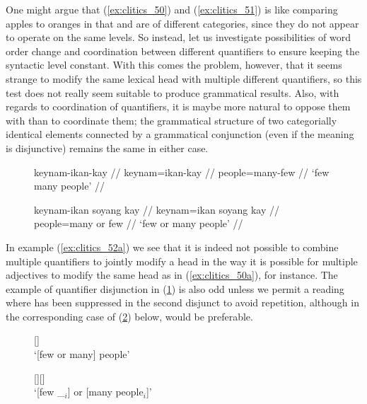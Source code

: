 One might argue that (\ref{ex:clitics_50}) and (\ref{ex:clitics_51}) is like
comparing apples to oranges in that  and
 are of different categories, since they do not
appear to operate on the same levels. So instead, let us investigate
possibilities of word order change and coordination between different
quantifiers to ensure keeping the syntactic level constant. With this comes the
problem, however, that it seems strange to modify the same lexical head with
multiple different quantifiers, so this test does not really seem suitable to
produce grammatical results. Also, with regards to coordination of quantifiers,
it is maybe more natural to oppose them with  than to
coordinate them; the grammatical structure of two categorially identical
elements connected by a grammatical conjunction (even if the meaning is
disjunctive) remains the same in either case.

\begin{figure}[h]
\pex\label{ex:clitics_52}
\a\label{ex:clitics_52a}\ljudge{*}\begingl
	\gla keynam-ikan-kay //
	\glb keynam=ikan-kay //
	\glc people=many-few //
	\glft `few many people' //
\endgl

\a\label{ex:clitics_52b}\ljudge{\ques}\begingl
	\gla keynam-ikan soyang kay //
	\glb keynam=ikan soyang kay //
	\glc people=many or few //
	\glft `few or many people' //
\endgl
\xe
\end{figure}

In example (\ref{ex:clitics_52a}) we see that it is indeed not possible to
combine multiple quantifiers to jointly modify a head in the way it is possible
for multiple adjectives to modify the same head as in (\ref{ex:clitics_50a}),
for instance. The example of quantifier disjunction in (\ref{ex:clitics_52b})
is also odd unless we permit a reading where
 has been suppressed in the second disjunct to
avoid repetition, although in the corresponding case of (\ref{ex:clitics_53b})
below,  would be preferable.

\begin{figure}[h]
\pex\label{ex:clitics_53}
\a\label{ex:clitics_53a}
	\ljudge{\ques\ques} [] \\
		`[few or many] people'

\a\label{ex:clitics_53b}
	\ljudge{\ques} [][]	\\
		`[few \_$_i$] or [many people$_i$]'
\xe
\end{figure}

